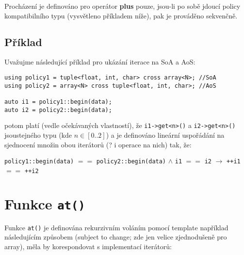 \documentclass[a4paper,12pt]{article}
\begin{document}
    Procházení je definováno pro operátor \textbf{plus} pouze, jsou-li po sobě jdoucí policy kompatibilního typu (vysvětleno příkladem níže), pak je prováděno sekvenčně.

    \subsection{Příklad}

    Uvažujme následující příklad pro ukázání iterace na SoA a AoS:
    \begin{lstlisting}
using policy1 = tuple<float, int, char> cross array<N>; //SoA
using policy2 = array<N> cross tuple<float, int, char>; //AoS

auto i1 = policy1::begin(data);
auto i2 = policy2::begin(data);
    \end{lstlisting}

    potom platí (vedle očekávaných vlastností), že \lstinline{i1->get<n>()} a \lstinline{i2->get<n>()} jsou\linebreak stejného typu (kde $n \in [0..2]$) a je definováno lineární uspořádání na sjednocení množin obou iterátorů (? i operace na nich) tak, že:

    \begin{center}
        \lstinline{policy1::begin(data)} $==$ \lstinline{policy2::begin(data)} $\wedge$
    \lstinline{i1} $==$ \lstinline{i2} $\to$ \lstinline{++i1} $==$ \lstinline{++i2}
    \end{center}

    \section{Funkce \lstinline{at()}}

    Funkce \lstinline{at()} je definována rekurzivním voláním pomocí template například následujícím způsobem (subject to change; zde jen velice zjednodušeně pro array), měla by korespondovat s implementací iterátorů:
    
\end{document}
